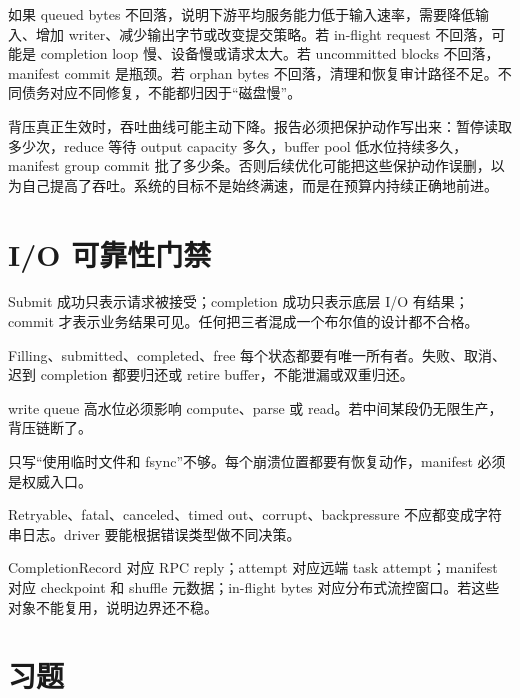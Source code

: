 如果 queued bytes 不回落，说明下游平均服务能力低于输入速率，需要降低输入、增加 writer、减少输出字节或改变提交策略。若 in-flight request 不回落，可能是 completion loop 慢、设备慢或请求太大。若 uncommitted blocks 不回落，manifest commit 是瓶颈。若 orphan bytes 不回落，清理和恢复审计路径不足。不同债务对应不同修复，不能都归因于“磁盘慢”。

背压真正生效时，吞吐曲线可能主动下降。报告必须把保护动作写出来：暂停读取多少次，reduce 等待 output capacity 多久，buffer pool 低水位持续多久，manifest group commit 批了多少条。否则后续优化可能把这些保护动作误删，以为自己提高了吞吐。系统的目标不是始终满速，而是在预算内持续正确地前进。

\section{I/O 可靠性门禁}

Submit 成功只表示请求被接受；completion 成功只表示底层 I/O 有结果；commit 才表示业务结果可见。任何把三者混成一个布尔值的设计都不合格。

Filling、submitted、completed、free 每个状态都要有唯一所有者。失败、取消、迟到 completion 都要归还或 retire buffer，不能泄漏或双重归还。

write queue 高水位必须影响 compute、parse 或 read。若中间某段仍无限生产，背压链断了。

只写“使用临时文件和 fsync”不够。每个崩溃位置都要有恢复动作，manifest 必须是权威入口。

Retryable、fatal、canceled、timed out、corrupt、backpressure 不应都变成字符串日志。driver 要能根据错误类型做不同决策。

CompletionRecord 对应 RPC reply；attempt 对应远端 task attempt；manifest 对应 checkpoint 和 shuffle 元数据；in-flight bytes 对应分布式流控窗口。若这些对象不能复用，说明边界还不稳。

\section{习题}

